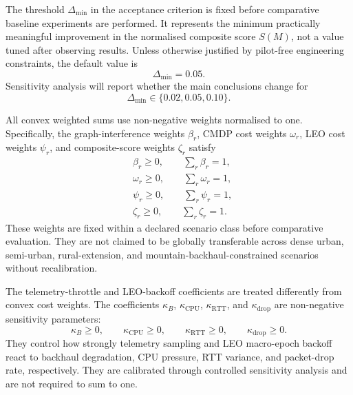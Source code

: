 The threshold $\Delta_{\min}$ in the acceptance criterion is fixed before comparative
baseline experiments are performed. It represents the minimum practically meaningful
improvement in the normalised composite score $S(M)$, not a value tuned after
observing results. Unless otherwise justified by pilot-free engineering constraints, the
default value is
\begin{equation}
  \Delta_{\min}=0.05.
  \label{eq:delta-min-default}
\end{equation}
Sensitivity analysis will report whether the main conclusions change for
\begin{equation}
  \Delta_{\min}\in\{0.02,0.05,0.10\}.
  \label{eq:delta-min-sensitivity}
\end{equation}

All convex weighted sums use non-negative weights normalised to one. Specifically,
the graph-interference weights $\beta_r$, CMDP cost weights $\omega_r$, LEO cost
weights $\psi_r$, and composite-score weights $\zeta_r$ satisfy
\begin{align}
  &\beta_r\geq0,\qquad \sum_r\beta_r=1, \label{eq:beta-normalisation}\\
  &\omega_r\geq0,\qquad \sum_r\omega_r=1, \label{eq:omega-normalisation}\\
  &\psi_r\geq0,\qquad \sum_r\psi_r=1, \label{eq:psi-normalisation}\\
  &\zeta_r\geq0,\qquad \sum_r\zeta_r=1. \label{eq:zeta-normalisation}
\end{align}
These weights are fixed within a declared scenario class before comparative
evaluation. They are not claimed to be globally transferable across dense urban,
semi-urban, rural-extension, and mountain-backhaul-constrained scenarios without
recalibration.

The telemetry-throttle and LEO-backoff coefficients are treated differently from
convex cost weights. The coefficients $\kappa_B$, $\kappa_{\mathrm{CPU}}$,
$\kappa_{\mathrm{RTT}}$, and $\kappa_{\mathrm{drop}}$ are non-negative sensitivity
parameters:
\begin{equation}
  \kappa_B\geq0,\qquad
  \kappa_{\mathrm{CPU}}\geq0,\qquad
  \kappa_{\mathrm{RTT}}\geq0,\qquad
  \kappa_{\mathrm{drop}}\geq0.
  \label{eq:kappa-nonnegative}
\end{equation}
They control how strongly telemetry sampling and LEO macro-epoch backoff react to
backhaul degradation, CPU pressure, RTT variance, and packet-drop rate,
respectively. They are calibrated through controlled sensitivity analysis and are not
required to sum to one.

